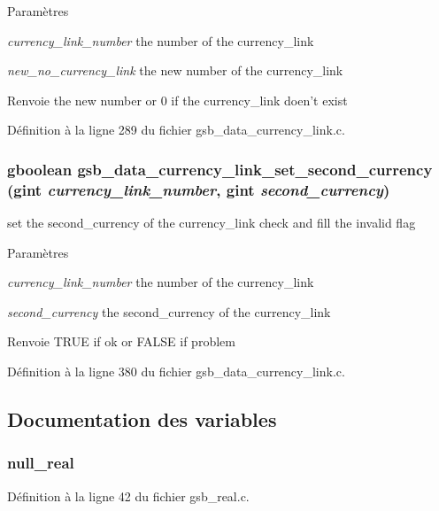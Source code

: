 \begin{DoxyParams}{Paramètres}
\item[{\em currency\_\-link\_\-number}]the number of the currency\_\-link \item[{\em new\_\-no\_\-currency\_\-link}]the new number of the currency\_\-link\end{DoxyParams}
\begin{DoxyReturn}{Renvoie}
the new number or 0 if the currency\_\-link doen't exist 
\end{DoxyReturn}


Définition à la ligne 289 du fichier gsb\_\-data\_\-currency\_\-link.c.

\subsubsection[{gsb\_\-data\_\-currency\_\-link\_\-set\_\-second\_\-currency}]{\setlength{\rightskip}{0pt plus 5cm}gboolean gsb\_\-data\_\-currency\_\-link\_\-set\_\-second\_\-currency (gint {\em currency\_\-link\_\-number}, \/  gint {\em second\_\-currency})}\label{gsb__data__currency__link_8c_ab8ecae95419928fd21f71f9f9e31e449}
set the second\_\-currency of the currency\_\-link check and fill the invalid flag


\begin{DoxyParams}{Paramètres}
\item[{\em currency\_\-link\_\-number}]the number of the currency\_\-link \item[{\em second\_\-currency}]the second\_\-currency of the currency\_\-link\end{DoxyParams}
\begin{DoxyReturn}{Renvoie}
TRUE if ok or FALSE if problem 
\end{DoxyReturn}


Définition à la ligne 380 du fichier gsb\_\-data\_\-currency\_\-link.c.



\subsection{Documentation des variables}
\subsubsection[{null\_\-real}]{ {\bf null\_\-real}}\label{gsb__data__currency__link_8c_a26f304bec3fdc0651b9aa8765d4de3c6}


Définition à la ligne 42 du fichier gsb\_\-real.c.

